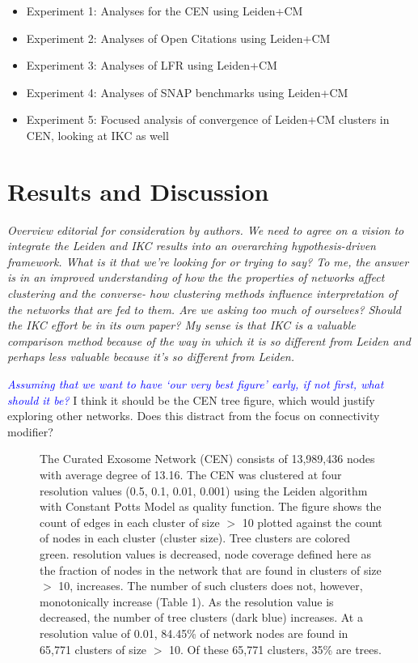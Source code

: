 \documentclass[12pt, oneside]{article}   	%
\begin{document}
\begin{itemize}
\item Experiment 1: Analyses  for the CEN using Leiden+CM
\item Experiment 2: Analyses of Open Citations using Leiden+CM
\item Experiment 3: Analyses of LFR using Leiden+CM
\item Experiment 4: Analyses of SNAP benchmarks using Leiden+CM
\item Experiment 5: Focused analysis of convergence of Leiden+CM clusters in CEN, looking at IKC as well
\end{itemize}


\section{Results and Discussion}

\emph{Overview editorial for consideration by authors. We need to agree on a vision to integrate the Leiden and IKC results into an overarching hypothesis-driven framework. What is it that we're looking for or trying to say? To me, the answer is in an improved understanding of how the the properties of networks affect clustering and the converse- how clustering methods influence interpretation of the networks that are fed to them. Are we asking too much of ourselves? Should the IKC effort be in its own paper? My sense is that IKC is a valuable comparison method because of the way in which it is so different from Leiden and perhaps less valuable because it's so different from Leiden.}

\textcolor{blue}{\emph{Assuming that we want to have `our very best figure' early, if not first, what should it be?}} I think it should be the CEN tree figure, which would justify exploring other networks.  Does this distract from the focus on connectivity modifier?

\begin{figure}[H]
\centering

\caption{The Curated Exosome Network (CEN) consists of 13,989,436 nodes with average degree of 13.16. The CEN was clustered at four resolution values (0.5, 0.1, 0.01, 0.001) using the Leiden algorithm with Constant Potts Model as quality function. The figure shows the count of edges in each cluster of size $>$  10 plotted against the count of nodes in each cluster (cluster size). Tree clusters are colored green.  resolution values is decreased, node coverage defined here as the fraction of nodes in the network that are found in clusters of size $>$  10, increases. The number of such clusters does not, however, monotonically increase (Table 1). As the resolution value is decreased, the number of tree clusters (dark blue) increases. At a resolution value of 0.01, 84.45\% of network nodes are found in 65,771 clusters of size $>$ 10. Of these 65,771 clusters, 35\% are trees.}
\end{figure}
\end{document}
